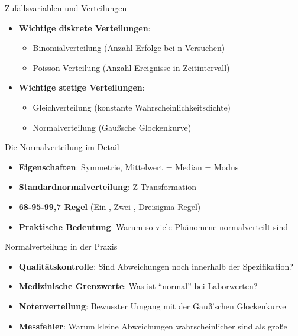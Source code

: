 \documentclass[
  ignorenonframetext,
]{beamer}
\providecommand{\tightlist}{%
  \setlength{\itemsep}{0pt}\setlength{\parskip}{0pt}}
\begin{document}
\begin{frame}{Zufallsvariablen und Verteilungen}
\protect{}\label{zufallsvariablen-und-verteilungen}
\begin{itemize}
\tightlist
\item
  \textbf{Wichtige diskrete Verteilungen}:

  \begin{itemize}
  \tightlist
  \item
    Binomialverteilung (Anzahl Erfolge bei n Versuchen)
  \item
    Poisson-Verteilung (Anzahl Ereignisse in Zeitintervall)
  \end{itemize}
\item
  \textbf{Wichtige stetige Verteilungen}:

  \begin{itemize}
  \tightlist
  \item
    Gleichverteilung (konstante Wahrscheinlichkeitsdichte)
  \item
    Normalverteilung (Gaußsche Glockenkurve)
  \end{itemize}
\end{itemize}
\end{frame}

\begin{frame}{Die Normalverteilung im Detail}
\protect{}\label{die-normalverteilung-im-detail}
\begin{itemize}
\tightlist
\item
  \textbf{Eigenschaften}: Symmetrie, Mittelwert = Median = Modus
\item
  \textbf{Standardnormalverteilung}: Z-Transformation
\item
  \textbf{68-95-99,7 Regel} (Ein-, Zwei-, Dreisigma-Regel)
\item
  \textbf{Praktische Bedeutung}: Warum so viele Phänomene normalverteilt
  sind
\end{itemize}
\end{frame}

\begin{frame}{Normalverteilung in der Praxis}
\protect{}\label{normalverteilung-in-der-praxis}
\begin{itemize}
\tightlist
\item
  \textbf{Qualitätskontrolle}: Sind Abweichungen noch innerhalb der
  Spezifikation?
\item
  \textbf{Medizinische Grenzwerte}: Was ist ``normal'' bei Laborwerten?
\item
  \textbf{Notenverteilung}: Bewusster Umgang mit der Gauß'schen
  Glockenkurve
\item
  \textbf{Messfehler}: Warum kleine Abweichungen wahrscheinlicher sind
  als große
\end{itemize}
\end{frame}
\end{document}
